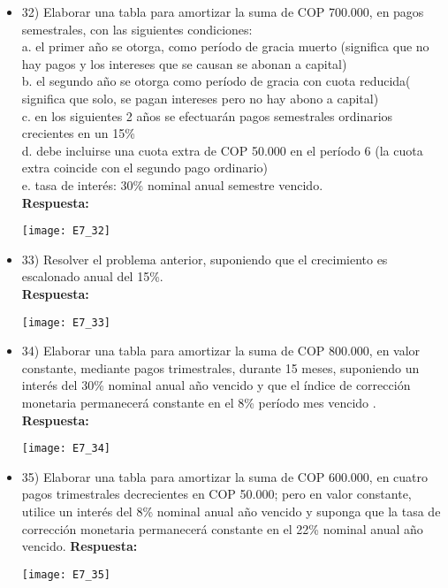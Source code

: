 \begin{itemize}
 \item 32)	 Elaborar una tabla para amortizar la suma de COP 700.000, en pagos semestrales, con las siguientes condiciones:\\
       a.	el primer año se otorga, como período de gracia muerto (significa que no hay pagos y los intereses que se causan se abonan a capital)\\
       b.	el segundo año se otorga como período de gracia con cuota reducida( significa que solo, se pagan intereses pero no hay abono a capital) \\
       c.	en los siguientes 2 años se efectuarán pagos semestrales ordinarios crecientes en un 15\% \\
       d.	debe incluirse una cuota extra de COP 50.000 en el período 6 (la cuota extra coincide con el segundo pago ordinario) \\
       e.	tasa de interés: 30\% nominal anual semestre vencido.\\

       \textbf{ Respuesta:}
       \begin{center}
        \texttt{[image: E7\_32]}
       \end{center}
       \medskip

 \item 33)	 Resolver el problema anterior, suponiendo que el crecimiento es escalonado anual del 15\%. \\
       \textbf{Respuesta:}
       \begin{center}
        \texttt{[image: E7\_33]}
       \end{center}
       \medskip

 \item 34) Elaborar una tabla para amortizar la suma de COP 800.000, en valor constante, mediante pagos trimestrales, durante 15 meses, suponiendo un interés del 30\% nominal anual año vencido y que el índice de corrección monetaria permanecerá constante en el 8\% período mes vencido .\\
       \textbf{ Respuesta:}
       \begin{center}
        \texttt{[image: E7\_34]}
       \end{center}
       \medskip

 \item 35)   Elaborar una tabla para amortizar la suma de COP 600.000, en cuatro pagos trimestrales decrecientes en COP 50.000; pero en valor constante, utilice un interés del 8\% nominal anual año vencido y suponga que la tasa de corrección monetaria permanecerá constante en el 22\% nominal anual año vencido.
       \textbf{Respuesta:}
       \begin{center}
        \texttt{[image: E7\_35]}
       \end{center}
       \medskip


\end{itemize}

